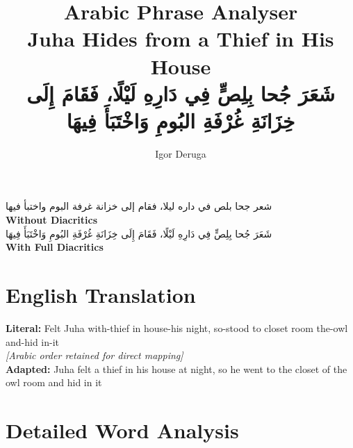 \documentclass[letter,12pt]{article}
\begin{document}
\title{\textbf{\Large Arabic Phrase Analyser}\\
\large Juha Hides from a Thief in His House\\
\normalsize \textarabic{شَعَرَ جُحا بِلِصٍّ فِي دَارِهِ لَيْلًا، فَقَامَ إِلَى خِزَانَةِ غُرْفَةِ البُومِ وَاخْتَبَأَ فِيهَا}}
\author{Igor Deruga}
\date{}
\maketitle

\begin{tcolorbox}[colback=boxcolor,colframe=headercolor,title=\textbf{Arabic Phrase},breakable]
\centering
\textarabic{شعر جحا بلص في داره ليلا، فقام إلى خزانة غرفة البوم واختبأ فيها}
\\[0.5em]
\textbf{Without Diacritics}
\\[1em]
\textarabic{شَعَرَ جُحا بِلِصٍّ فِي دَارِهِ لَيْلًا، فَقَامَ إِلَى خِزَانَةِ غُرْفَةِ البُومِ وَاخْتَبَأَ فِيهَا}
\\[0.5em]
\textbf{With Full Diacritics}
\end{tcolorbox}

\section{English Translation}
\begin{tcolorbox}[colback=white,colframe=accentcolor,breakable]
\textbf{Literal:} Felt Juha with-thief in house-his night, so-stood to closet room the-owl and-hid in-it \\
\textit{[Arabic order retained for direct mapping]}\\[0.5em]
\textbf{Adapted:} Juha felt a thief in his house at night, so he went to the closet of the owl room and hid in it
\end{tcolorbox}

\section{Detailed Word Analysis}
\end{document}
